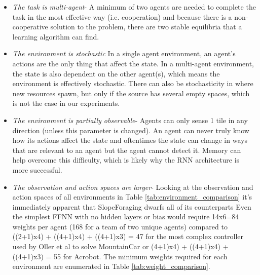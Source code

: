 \documentclass[12pt]{article}
\begin{document}
\begin{itemize}

\item \textit{The task is multi-agent}- A minimum of two agents are needed to complete the task in the most effective way (i.e. cooperation) and because there is a non-cooperative solution to the problem, there are two stable equilibria that a learning algorithm can find.

\item \textit{The environment is stochastic} In a single agent environment, an agent's actions are the only thing that affect the state.
In a multi-agent environment, the state is also dependent on the other agent(s), which means the environment is effectively stochastic.
There can also be stochasticity in where new resources spawn, but only if the source has several empty spaces, which is not the case in our experiments.

\item \textit{The environment is partially observable}- Agents can only sense 1 tile in any direction (unless this parameter is changed).
An agent can never truly know how its actions affect the state and oftentimes the state can change in ways that are relevant to an agent but the agent cannot detect it.
Memory can help overcome this difficulty, which is likely why the RNN architecture is more successful.

\item \textit{The observation and action spaces are larger}- Looking at the observation and action spaces of all environments in Table \ref{tab:environment_comparison} it's immediately apparent that SlopeForaging dwarfs all of its counterparts
Even the simplest FFNN with no hidden layers or bias would require 14x6=84 weights per agent (168 for a team of two unique agents) compared to ((2+1)x4) + ((4+1)x4) + ((4+1)x3) = 47 for the most complex controller used by Oller et al to solve MountainCar or (4+1)x4) + ((4+1)x4) + ((4+1)x3) = 55 for Acrobot.
The minimum weights required for each environment are enumerated in Table \ref{tab:weight_comparison}.

\end{itemize}
\end{document}
